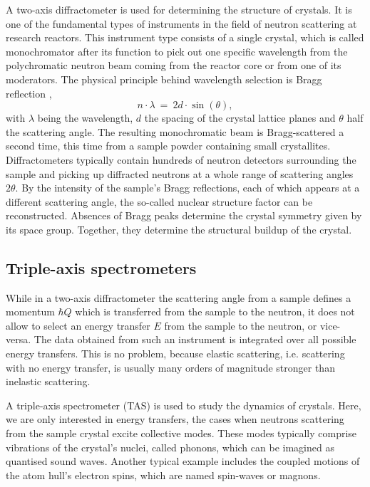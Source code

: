 A two-axis diffractometer is used for determining the structure of crystals. It is one of the fundamental types of instruments in the field of neutron scattering at research reactors. This instrument type consists of a single crystal, which is called monochromator after its function to pick out one specific wavelength from the polychromatic neutron beam coming from the reactor core or from one of its moderators. The physical principle behind wavelength selection is Bragg reflection \cite[p. 68]{Gross2012}, 
\begin{equation}
	n \cdot \lambda \ =\  2 d \cdot \sin\left(\theta\right),
\end{equation}
with $\lambda$ being the wavelength, $d$ the spacing of the crystal lattice planes and $\theta$ half the scattering angle.
The resulting monochromatic beam is Bragg-scattered a second time, this time from a sample powder containing small crystallites. Diffractometers typically contain hundreds of neutron detectors surrounding the sample and picking up diffracted neutrons at a whole range of scattering angles $2 \theta$. By the intensity of the sample's Bragg reflections, each of which appears at a different scattering angle, the so-called nuclear structure factor can be reconstructed. Absences of Bragg peaks determine the crystal symmetry given by its space group. Together, they determine the structural buildup of the crystal.


\subsection{Triple-axis spectrometers}

While in a two-axis diffractometer the scattering angle from a sample defines a momentum $\hbar Q$ which is transferred from the sample to the neutron, it does not allow to select an energy transfer $E$ from the sample to the neutron, or vice-versa. The data obtained from such an instrument is integrated over all possible energy transfers. This is no problem, because elastic scattering, i.e. scattering with no energy transfer, is usually many orders of magnitude stronger than inelastic scattering.

A triple-axis spectrometer (TAS) is used to study the dynamics of crystals. Here, we are only interested in energy transfers, the cases when neutrons scattering from the sample crystal excite collective modes. These modes typically comprise vibrations of the crystal's nuclei, called phonons, which can be imagined as quantised sound waves. Another typical example includes the coupled motions of the atom hull's electron spins, which are named spin-waves or magnons.


